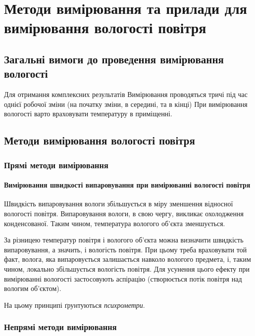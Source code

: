 \chapter{Методи вимірювання та прилади для вимірювання вологості повітря}

\section{Загальні вимоги до проведення  вимірювання вологості}

Для отримання комплексних результатів Вимірювання проводяться тричі під час однієї робочої зміни (на
початку зміни, в середині, та в кінці) При вимірювання вологості варто враховувати температуру в
приміщенні.

\section{Методи вимірювання вологості повітря}

\subsection{Прямі методи вимірювання}

\tocless\subsubsection{Вимірювання швидкості випаровування при вимірюванні вологості повітря}

Швидкість випаровування вологи збільшується в міру зменшення відносної вологості повітря.
Випаровування вологи, в свою чергу, викликає охолодження конденсованої. Таким чином, температура
вологого об'єкта зменшується.

За різницею температур повітря і вологого об'єкта можна визначити
швидкість випаровування, а значить, і вологість повітря. При цьому треба враховувати той факт,
волога, яка випаровується залишається навколо вологого предмета, і, таким чином, локально
збільшується вологість повітря. Для усунення цього ефекту при вимірюванні вологості застосовують
аспірацію (створюється потік повітря над вологим об'єктом).

На цьому принципі ґрунтуються \textit{психрометри}.

\subsection{Непрямі методи вимірювання}

